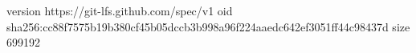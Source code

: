 version https://git-lfs.github.com/spec/v1
oid sha256:cc88f7575b19b380cf45b05dccb3b998a96f224aaedc642ef3051ff44c98437d
size 699192
